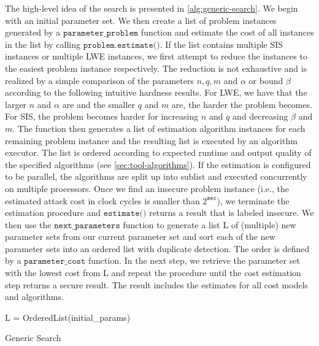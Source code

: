 The high-level idea of the search is presented in \cref{alg:generic-search}. We begin with an initial parameter set. We then create a list of problem instances generated by a $\texttt{parameter\_problem}$ function and estimate the cost of all instances in the list by calling $\texttt{problem.estimate()}$. If the list contains multiple SIS instances or multiple LWE instances, we first attempt to reduce the instances to the easiest problem instance respectively. The reduction is not exhaustive and is realized by a simple comparison of the parameters $n, q, m$ and $\alpha$ or bound $\beta$ according to the following intuitive hardness results. For LWE, we have that the larger $n$ and $\alpha$ are and the smaller $q$ and $m$ are, the harder the problem becomes. For SIS, the problem becomes harder for increasing $n$ and $q$ and decreasing $\beta$ and $m$. The function then generates a list of estimation algorithm instances for each remaining problem instance and the resulting list is executed by an algorithm executor. The list is ordered according to expected runtime and output quality of the specified algorithms (see \cref{sec:tool-algorithms}). If the estimation is configured to be parallel, the algorithms are split up into sublist and executed concurrently on multiple processors.
Once we find an insecure problem instance (i.e., the estimated attack cost in clock cycles is smaller than $2^{\texttt{sec}}$), we terminate the estimation procedure and $\texttt{estimate()}$ returns a result that is labeled insecure. We then use the $\texttt{next\_parameters}$ function to generate a list L of (multiple) new parameter sets from our current parameter set and sort each of the new parameter sets into an ordered list with duplicate detection. The order is defined by a $\texttt{parameter\_cost}$ function. In the next step, we retrieve the parameter set with the lowest cost from L and repeat the procedure until the cost estimation step returns a secure result. The result includes the estimates for all cost models and algorithms.

\begin{algorithm2e} %

    L = OrderedList(initial\_params)\\
    \caption{Generic Search} \label{alg:generic-search}
\end{algorithm2e}


